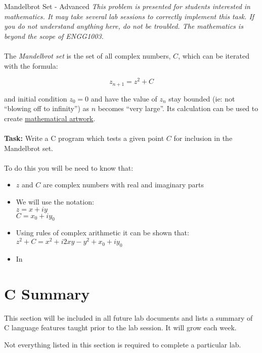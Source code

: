 \documentclass{lab}
\begin{document}
\begin{task}{Mandelbrot Set - Advanced}{}
\textit{This problem is presented for students interested in mathematics. It may take several lab sessions to correctly implement this task. If you do not understand anything here, do not be troubled. The mathematics is beyond the scope of ENGG1003.} \\ \\

The \textit{Mandelbrot set} is the set of all complex numbers, $C$, which can be iterated with the formula:

\begin{equation}
z_{n+1} = z^2 + C
\end{equation}

and initial condition $z_0 = 0$ and have the value of $z_n$ stay bounded (ie: not ``blowing off to infinity'') as $n$ becomes ``very large''. Its calculation can be used to create \underline{\href{https://www.google.com.au/search?q=mandelbrot+set}{mathematical artwork}}.
\\ \\
\textbf{Task:} Write a C program which tests a given point $C$ for inclusion in the Mandelbrot set.
\\ \\
To do this you will be need to know that:
\begin{itemize}
\item $z$ and $C$ are complex numbers with real and imaginary parts
\item We will use the notation: \\
$z = x + iy$ \\
$C = x_0 + iy_0$
\item Using rules of complex arithmetic it can be shown that: \\
$z^2 + C= x^2 + i2xy - y^2 + x_0 + iy_0$
\item In 
\end{itemize}
\end{task}

\pagebreak 
\section{C Summary}
This section will be included in all future lab documents and lists a summary of C language features taught prior to the lab session. It will grow each week.

Not everything listed in this section is required to complete a particular lab.
\end{document}
